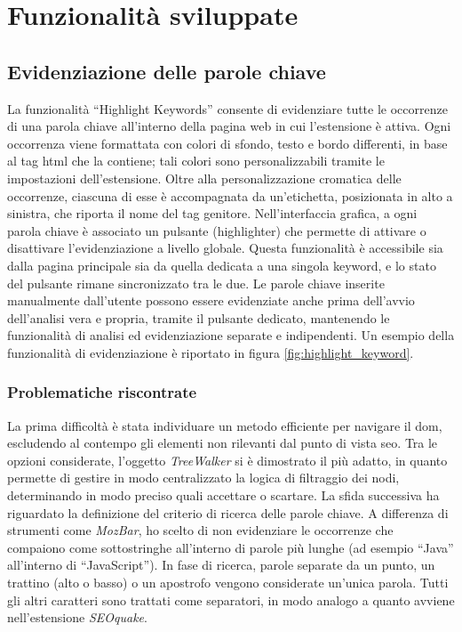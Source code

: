 \chapter{Funzionalità sviluppate}
\label{cap:funzionalità-sviluppate}

\section{Evidenziazione delle parole chiave}
\label{sec:highlight-keyword}

\par La funzionalità “Highlight Keywords” consente di evidenziare tutte le occorrenze di una parola chiave all’interno della pagina web in cui l’estensione è attiva. Ogni occorrenza viene formattata con colori di sfondo, testo e bordo differenti, in base al tag \gls{html} che la contiene; tali colori sono personalizzabili tramite le impostazioni dell’estensione. Oltre alla personalizzazione cromatica delle occorrenze, ciascuna di esse è accompagnata da un’etichetta, posizionata in alto a sinistra, che riporta il nome del tag genitore. Nell’interfaccia grafica, a ogni parola chiave è associato un pulsante (highlighter) che permette di attivare o disattivare l’evidenziazione a livello globale. Questa funzionalità è accessibile sia dalla pagina principale sia da quella dedicata a una singola keyword, e lo stato del pulsante rimane sincronizzato tra le due. Le parole chiave inserite manualmente dall'utente possono essere evidenziate anche prima dell’avvio dell’analisi vera e propria, tramite il pulsante dedicato, mantenendo le funzionalità di analisi ed evidenziazione separate e indipendenti. Un esempio della funzionalità di evidenziazione è riportato in figura \ref{fig:highlight_keyword}.

\subsection{Problematiche riscontrate}

\par La prima difficoltà è stata individuare un metodo efficiente per navigare il \gls{dom}, escludendo al contempo gli elementi non rilevanti dal punto di vista \gls{seo}. Tra le opzioni considerate, l’oggetto \textit{TreeWalker} si è dimostrato il più adatto, in quanto permette di gestire in modo centralizzato la logica di filtraggio dei nodi, determinando in modo preciso quali accettare o scartare. La sfida successiva ha riguardato la definizione del criterio di ricerca delle parole chiave. A differenza di strumenti come \textit{MozBar}, ho scelto di non evidenziare le occorrenze che compaiono come sottostringhe all’interno di parole più lunghe (ad esempio “Java” all’interno di “JavaScript”). In fase di ricerca, parole separate da un punto, un trattino (alto o basso) o un apostrofo vengono considerate un’unica parola. Tutti gli altri caratteri sono trattati come separatori, in modo analogo a quanto avviene nell’estensione \textit{SEOquake}.

